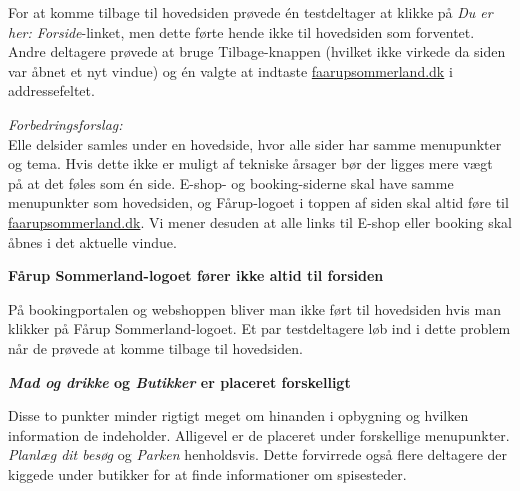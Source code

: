 \documentclass[10pt,a4paper]{article}      %
\newenvironment{forslag}{\emph{Forbedringsforslag:}\\[0.5mm]}{}
\newcommand\pic[1]{\texttt{[image: Pics/\#1]}}
\renewcommand\smallproblem{\pic{smallproblem}}
\begin{document}
\begin{kommentarer}
For at komme tilbage til hovedsiden prøvede én testdeltager at klikke på
\emph{Du er her: Forside}-linket, men dette førte hende ikke til hovedsiden som
forventet. Andre deltagere prøvede at bruge Tilbage-knappen (hvilket ikke
virkede da siden var åbnet et nyt vindue) og én valgte at indtaste
\url{faarupsommerland.dk} i addressefeltet.

\begin{forslag}

Elle delsider samles under en hovedside, hvor alle sider har samme menupunkter og tema. Hvis dette ikke er muligt af tekniske årsager bør der ligges mere vægt på at det føles som én side. E-shop- og booking-siderne skal have samme menupunkter som hovedsiden, og Fårup-logoet i toppen af siden skal altid føre til \url{faarupsommerland.dk}. Vi mener desuden at alle links til E-shop eller booking skal åbnes i det aktuelle vindue.

\end{forslag}

\item[\smallproblem]{\textbf{Fårup Sommerland-logoet fører ikke altid til forsiden}}

På bookingportalen og webshoppen bliver man ikke ført til hovedsiden hvis man
klikker på Fårup Sommerland-logoet. Et par testdeltagere løb ind i dette problem
når de prøvede at komme tilbage til hovedsiden.

\item[\smallproblem] \textbf{\emph{Mad og drikke} og \emph{Butikker} er placeret forskelligt}

Disse to punkter minder rigtigt meget om hinanden i opbygning og hvilken
information de indeholder. Alligevel er de placeret under forskellige
menupunkter. \emph{Planlæg dit besøg} og \emph{Parken} henholdsvis. Dette
forvirrede også flere deltagere der kiggede under butikker for at finde
informationer om spisesteder.

\end{kommentarer}
\end{document}
